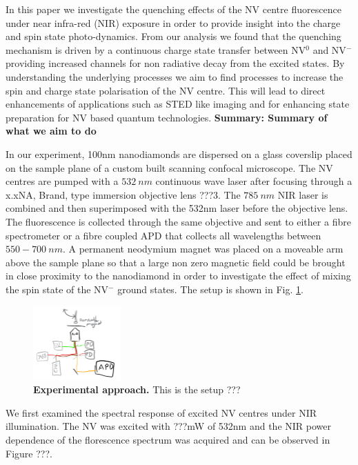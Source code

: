 \documentclass[prl]{revtex4}
\begin{document}
In this paper we investigate the quenching effects of the NV centre fluorescence under near infra-red (NIR) exposure in order to provide insight into the charge and spin state photo-dynamics. From our analysis we found that the quenching mechanism is driven by a continuous charge state transfer between NV$^0$ and NV$^-$ providing increased channels for non radiative decay from the excited states. By understanding the underlying processes we aim to find processes to increase the spin and charge state polarisation of the NV centre. This will lead to direct enhancements of applications such as STED like imaging and for enhancing state preparation for NV based quantum technologies.
\textbf{Summary: Summary of what we aim to do}

In our experiment, 100nm nanodiamonds are dispersed on a glass coverslip placed on the sample plane of a custom built scanning confocal microscope. The NV centres are pumped with a $\SI{532}{nm}$ continuous wave laser after focusing through a x.xNA, Brand, type immersion objective lens ???3. The $\SI{785}{nm}$ NIR laser is combined and then superimposed with the 532nm laser before the objective lens. The fluorescence is collected through the same objective and sent to either a fibre spectrometer or a fibre coupled APD that collects all wavelengths between $550-\SI{700}{nm}$. A permanent neodymium magnet was placed on a moveable arm above the sample plane so that a large non zero magnetic field could be brought in close proximity to the nanodiamond in order to investigate the effect of mixing the spin state of the NV$^-$ ground states. The setup is shown in Fig. \ref{FigSetup}.

\begin{figure}[t]
  \centering
  \includegraphics[width=0.3\textwidth]{Setup.png} 
 \caption{\textbf{Experimental approach.} This is the setup ???} \label{FigSetup}
\end{figure}

We first examined the spectral response of excited NV centres under NIR illumination. The NV was excited with ???mW of 532nm and the NIR power dependence of the florescence spectrum was acquired and can be observed in Figure ???.
\end{document}

